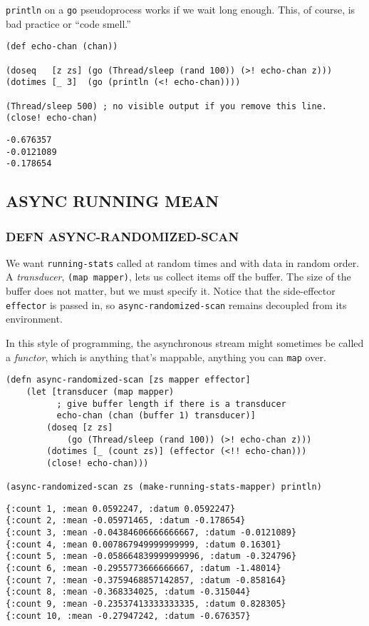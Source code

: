 \documentclass[10pt,oneside,x11names]{article}
\begin{document}
\texttt{println} on a \texttt{go} pseudoprocess works if we wait long enough. This, of
course, is bad practice or ``code smell.''

\begin{verbatim}
(def echo-chan (chan))

(doseq   [z zs] (go (Thread/sleep (rand 100)) (>! echo-chan z)))
(dotimes [_ 3]  (go (println (<! echo-chan))))

(Thread/sleep 500) ; no visible output if you remove this line.
(close! echo-chan)
\end{verbatim}

\begin{verbatim}
-0.676357
-0.0121089
-0.178654
\end{verbatim}

\subsection{ASYNC RUNNING MEAN}
\label{async-running-mean}
\subsubsection{DEFN ASYNC-RANDOMIZED-SCAN}
\label{async-randomized-scan}
We want \texttt{running-stats} called at random times and with data in random
order. A \emph{transducer}, \texttt{(map mapper)}, lets us collect items off the
buffer. The size of the buffer does not matter, but we must specify it.
Notice that the side-effector \texttt{effector} is passed in, so
\texttt{async-randomized-scan} remains decoupled from its environment.

In this style of programming, the asynchronous stream might sometimes be
called a \emph{functor}, which is anything that's mappable, anything you can
\texttt{map} over.

\begin{verbatim}
(defn async-randomized-scan [zs mapper effector]
    (let [transducer (map mapper)
          ; give buffer length if there is a transducer
          echo-chan (chan (buffer 1) transducer)]
        (doseq [z zs]
            (go (Thread/sleep (rand 100)) (>! echo-chan z)))
        (dotimes [_ (count zs)] (effector (<!! echo-chan)))
        (close! echo-chan)))

(async-randomized-scan zs (make-running-stats-mapper) println)
\end{verbatim}

\begin{verbatim}
{:count 1, :mean 0.0592247, :datum 0.0592247}
{:count 2, :mean -0.05971465, :datum -0.178654}
{:count 3, :mean -0.04384606666666667, :datum -0.0121089}
{:count 4, :mean 0.007867949999999999, :datum 0.16301}
{:count 5, :mean -0.058664839999999996, :datum -0.324796}
{:count 6, :mean -0.2955773666666667, :datum -1.48014}
{:count 7, :mean -0.3759468857142857, :datum -0.858164}
{:count 8, :mean -0.368334025, :datum -0.315044}
{:count 9, :mean -0.23537413333333335, :datum 0.828305}
{:count 10, :mean -0.27947242, :datum -0.676357}
\end{verbatim}
\end{document}
